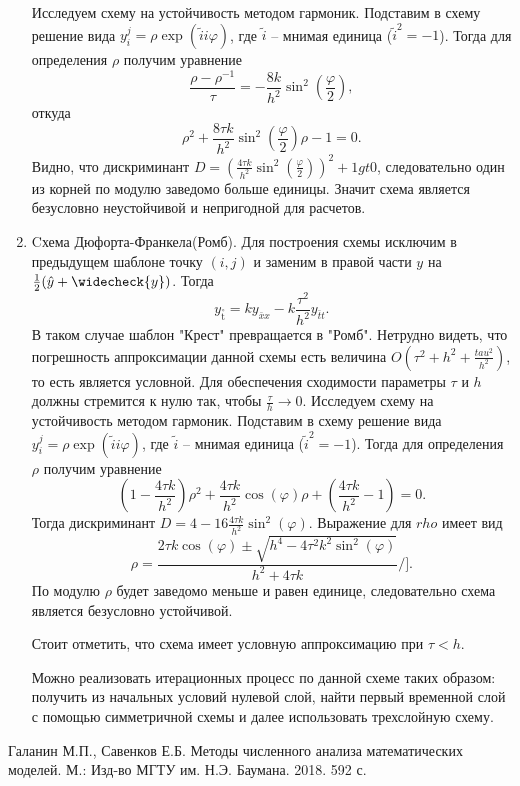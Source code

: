 \documentclass[12pt, a4paper]{article}
\renewcommand{\phi}{\varphi}
\newcommand{\down}[1]{\widecheck{#1}}
\newcommand{\pon}[1]{\mathop {#1}\limits^ \circ}
\begin{document}
\begin{enumerate}
		Исследуем схему на устойчивость методом гармоник. Подставим в схему решение вида $y_i^j = \rho \exp{(\widetilde{i} i \phi)}$, где $\widetilde{i}$ -- мнимая единица ($\widetilde{i}^2 = -1$). Тогда для определения $\rho$ получим уравнение
		\begin{equation*}
			\frac{\rho-\rho^{-1}}{\tau} = -\frac{8k}{h^2}\sin^2(\frac{\phi}{2}),
		\end{equation*}
		откуда
		\begin{equation*}
		\rho^2 + \frac{8\tau k}{h^2} \sin^2(\frac{\phi}{2}) \rho - 1 = 0.
		\end{equation*}
		Видно, что дискриминант $D = (\frac{4\tau k}{h^2} \sin^2(\frac{\phi}{2}))^2 + 1 gt 0$, следовательно один из корней по модулю заведомо больше единицы. Значит схема является безусловно неустойчивой и непригодной для расчетов.
		\item Cхема Дюфорта-Франкела(Ромб).
		Для построения схемы исключим в предыдущем шаблоне точку $(i, j)$ и заменим в правой части $y$ на $\frac{1}{2}(\hat{y} + \down{y})$. Тогда
		\begin{equation*}
			y_{\pon{t}} = k y_{\bar{x}x} - k \frac{\tau^2}{h^2} y_{\bar{t}t}.
		\end{equation*}
		В таком случае шаблон "Крест" превращается в "Ромб". Нетрудно видеть, что погрешность аппроксимации данной схемы есть величина $O(\tau^2 + h^2 + \frac{tau^2}{h^2})$, то есть является условной. Для обеспечения сходимости параметры $\tau$ и $h$ должны стремится к нулю так, чтобы $\frac{\tau}{h} \to 0$. 
		Исследуем схему на устойчивость методом гармоник. Подставим в схему решение вида $y_i^j = \rho \exp{(\widetilde{i} i \phi)}$, где $\widetilde{i}$ -- мнимая единица ($\widetilde{i}^2 = -1$). Тогда для определения $\rho$ получим уравнение
		\begin{equation*}
			(1 - \frac{4 \tau k}{h^2}) \rho^2 + \frac{4 \tau k} {h^2} \cos(\phi) \rho + (\frac{4 \tau k} {h^2} - 1) = 0.
		\end{equation*}
		Тогда дискриминант $D = 4 - 16 \frac{4 \tau k} {h^2} \sin^2(\phi)$. Выражение для $rho$ имеет вид
		\begin{equation*}
			\rho = \frac{2 \tau k \cos(\phi) \pm \sqrt{h^4 - 4\tau^2 k^2 \sin^2(\phi)}}{h^2 + 4\tau k}/].
		\end{equation*}
		По модулю $\rho$ будет заведомо меньше и равен единице, следовательно схема является безусловно устойчивой. 
		
		Стоит отметить, что схема имеет условную аппроксимацию при $\tau < h$.
		
		
		Можно реализовать итерационных процесс по данной схеме таких образом: получить из начальных условий нулевой слой, найти первый временной слой с помощью симметричной схемы и далее использовать трехслойную схему.
	\end{enumerate}
	
	
	
	\clearpage
	\begin{thebibliography}{1}
		 Галанин М.П., Савенков Е.Б. Методы численного анализа математических моделей. М.: Изд-во МГТУ им. Н.Э. Баумана. 2018. 592 с.
		
	\end{thebibliography}
	
\end{document}
